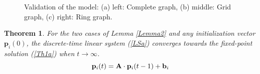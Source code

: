 \documentclass[10pt, conference, letterpaper]{IEEEtran}
\newtheorem{theo}{Theorem}
\begin{document}
{%
\begin{figure}[t]
\centering
\caption{Validation of the model: (a) left: Complete graph, (b) middle: Grid graph, (c) right: Ring graph.}
\label{valid fig}
\end{figure}



\begin{theo}
\label{t5}
For the two cases of Lemma \ref{Lemma2} and any initialization vector $\mathbf{p}_i(0)$, the discrete-time linear system (\ref{LSa}) converges towards the fixed-point solution (\ref{Th1a}) when $t\rightarrow \infty$.
\begin{equation}
\label{LSa}
\mathbf{p}_i(t) = \mathbf{A}\cdot \mathbf{p}_i(t-1) + \mathbf{b}_i\\
\end{equation}
\end{theo}

}
\end{document}
